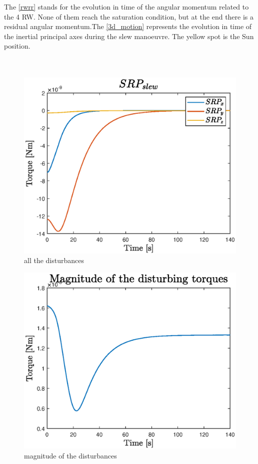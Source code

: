 \documentclass[11pt]{article}
\begin{document}
The \ref{rwrr} stands for the evolution in time of the angular momentum related to the 4 RW. None of them reach the saturation condition, but at the end there is a residual angular momentum.The \ref{3d_motion} represents the evolution in time of the inertial principal axes during the slew manoeuvre. The yellow spot is the Sun position.\\\\\\

\begin{minipage}{.55 \textwidth}
\begin{figure} [H]
\centering 
\includegraphics[scale=0.5]{SRP_slew.eps}
\caption{all the disturbances}
\end{figure}
\end{minipage}
\begin{minipage}{.45 \textwidth}
\begin{figure} [H]
\centering 
\includegraphics[scale=0.5]{magnitude.eps}
\caption{magnitude of the disturbances}
\end{figure}
\end{minipage}\\\\
\end{document}
